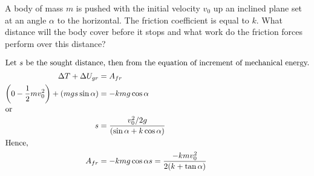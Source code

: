 \item A body of mass $m$ is pushed with the initial velocity $v_0$ up an inclined plane set at an angle $\alpha$ to the horizontal. The friction coefficient is equal to $k$. What distance will the body cover before it stops and what work do the friction forces perform over this distance?\begin{solution}
    
    \begin{align*}
        \intertext{Let \(s\) be the sought distance, then from the equation of increment of mechanical energy.}
        \Delta T + \Delta U_{gr} &= A_{fr}\\
        \left(0 - \dfrac{1}{2}mv_0^2\right) + (mgs \sin\alpha) &= -kmg \cos\alpha\\
        \intertext{or}
        s &= \dfrac{v_0^2/2g}{(\sin \alpha + k \cos \alpha)}\\
        \intertext{Hence,}
        A_{fr} &= -kmg \cos\alpha s = \dfrac{-km v_0^2}{2(k + \tan\alpha)}
    \end{align*}
\end{solution}